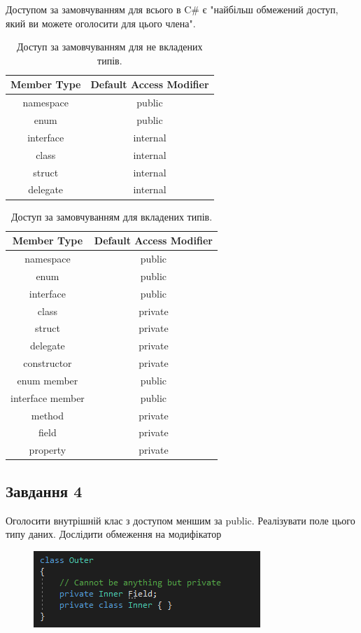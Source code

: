 \documentclass[oneside,14pt]{extarticle}
\begin{document}
\begin{normalsize}
	Доступом за замовчуванням для всього в C\# є "найбільш обмежений доступ, який ви можете оголосити для цього члена".
	
		\begin{table}[H]
		\centering
		\begin{tabular}{ |c|c| }
			\hline
			\textbf{Member Type} & \textbf{Default Access Modifier} \\ 
			\hline
			namespace & public \\ 
			\hline
			enum & public \\ 
			\hline
			interface & internal \\ 
			\hline
			class & internal \\ 
			\hline
			struct & internal \\ 
			\hline
			delegate & internal \\ 
			\hline
		\end{tabular}
		\caption{Доступ за замовчуванням для не вкладених типів.}
	\end{table}
	
	\begin{table}[H]
		\centering
		\begin{tabular}{ |c|c| }
			\hline
			\textbf{Member Type} & \textbf{Default Access Modifier} \\ 
			\hline
			namespace & public \\
			\hline
			enum & public \\
			\hline
			interface & public \\
			\hline
			class & private \\
			\hline
			struct & private \\
			\hline
			delegate & private \\
			\hline
			constructor & private \\ 
			\hline
			enum member & public\\ 
			\hline
			interface member & public \\ 
			\hline
			method & private \\ 
			\hline
			field & private \\  
			\hline
			property & private \\  
			\hline
		\end{tabular}
		\caption{Доступ за замовчуванням для вкладених типів.}
	\end{table}
		
	\subsection*{Завдання 4}
	Оголосити внутрішній клас з доступом меншим за public. Реалізувати поле цього
	типу даних. Дослідити обмеження на модифікатор
	\begin{figure}[H]
		\centering
		\includegraphics[scale=0.7]{14}
	\end{figure}


\end{normalsize}
\end{document}
